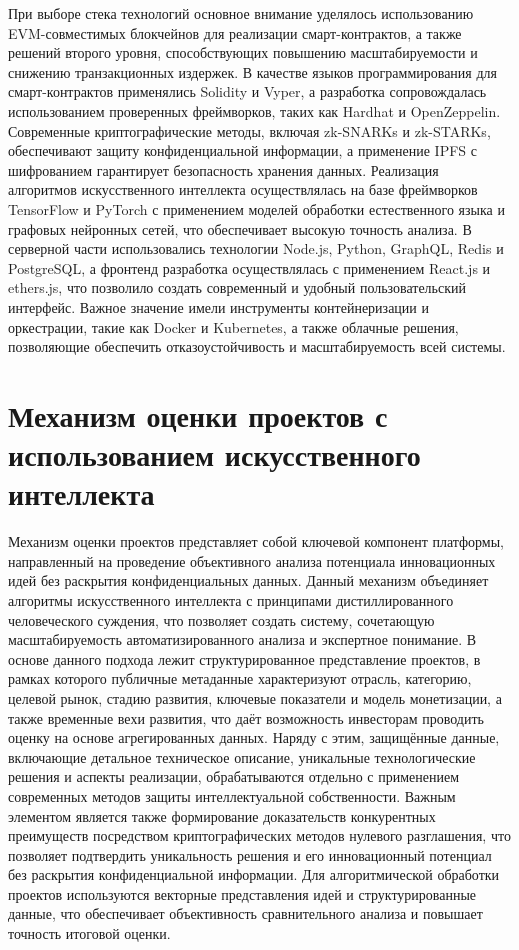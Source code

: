 \documentclass[
    candidate, %
    subf, %
    dotsinheaders=false,
]{disser}
\begin{document}
При выборе стека технологий основное внимание уделялось использованию EVM-совместимых блокчейнов для реализации смарт-контрактов, а также решений второго уровня, способствующих повышению масштабируемости и снижению транзакционных издержек. В качестве языков программирования для смарт-контрактов применялись Solidity и Vyper, а разработка сопровождалась использованием проверенных фреймворков, таких как Hardhat и OpenZeppelin. Современные криптографические методы, включая zk-SNARKs и zk-STARKs, обеспечивают защиту конфиденциальной информации, а применение IPFS с шифрованием гарантирует безопасность хранения данных. Реализация алгоритмов искусственного интеллекта осуществлялась на базе фреймворков TensorFlow и PyTorch с применением моделей обработки естественного языка и графовых нейронных сетей, что обеспечивает высокую точность анализа. В серверной части использовались технологии Node.js, Python, GraphQL, Redis и PostgreSQL, а фронтенд разработка осуществлялась с применением React.js и ethers.js, что позволило создать современный и удобный пользовательский интерфейс. Важное значение имели инструменты контейнеризации и оркестрации, такие как Docker и Kubernetes, а также облачные решения, позволяющие обеспечить отказоустойчивость и масштабируемость всей системы.

\section{Механизм оценки проектов с использованием искусственного интеллекта}

Механизм оценки проектов представляет собой ключевой компонент платформы, направленный на проведение объективного анализа потенциала инновационных идей без раскрытия конфиденциальных данных. Данный механизм объединяет алгоритмы искусственного интеллекта с принципами дистиллированного человеческого суждения, что позволяет создать систему, сочетающую масштабируемость автоматизированного анализа и экспертное понимание. В основе данного подхода лежит структурированное представление проектов, в рамках которого публичные метаданные характеризуют отрасль, категорию, целевой рынок, стадию развития, ключевые показатели и модель монетизации, а также временные вехи развития, что даёт возможность инвесторам проводить оценку на основе агрегированных данных. Наряду с этим, защищённые данные, включающие детальное техническое описание, уникальные технологические решения и аспекты реализации, обрабатываются отдельно с применением современных методов защиты интеллектуальной собственности. Важным элементом является также формирование доказательств конкурентных преимуществ посредством криптографических методов нулевого разглашения, что позволяет подтвердить уникальность решения и его инновационный потенциал без раскрытия конфиденциальной информации. Для алгоритмической обработки проектов используются векторные представления идей и структурированные данные, что обеспечивает объективность сравнительного анализа и повышает точность итоговой оценки.
\end{document}
